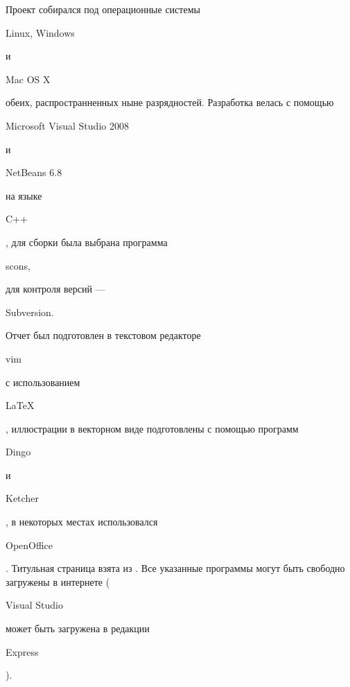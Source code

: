 Проект собирался под операционные системы \begin{tt}Linux, Windows\end{tt} и \begin{tt}Mac OS X\end{tt} обеих, распространненных ныне разрядностей.
Разработка велась с помощью \begin{tt}Microsoft Visual Studio 2008\end{tt} и \begin{tt}NetBeans 6.8\end{tt} на языке \begin{tt}C++\end{tt}, 
для сборки была выбрана программа \begin{tt}scons,\end{tt} для контроля версий --- \begin{tt}Subversion.\end{tt} Отчет был подготовлен в 
текстовом редакторе \begin{tt}vim\end{tt} с использованием \begin{tt}\LaTeX\end{tt}, иллюстрации в векторном виде подготовлены с помощью программ 
\begin{tt}Dingo\end{tt} и \begin{tt}Ketcher\end{tt}, в некоторых местах использовался \begin{tt}OpenOffice\end{tt}. Титульная страница 
взята из \cite[стр.26]{gluhov}. Все указанные программы могут быть свободно загружены в интернете (\begin{tt}Visual Studio\end{tt} может быть
загружена в редакции \begin{tt}Express\end{tt}).

